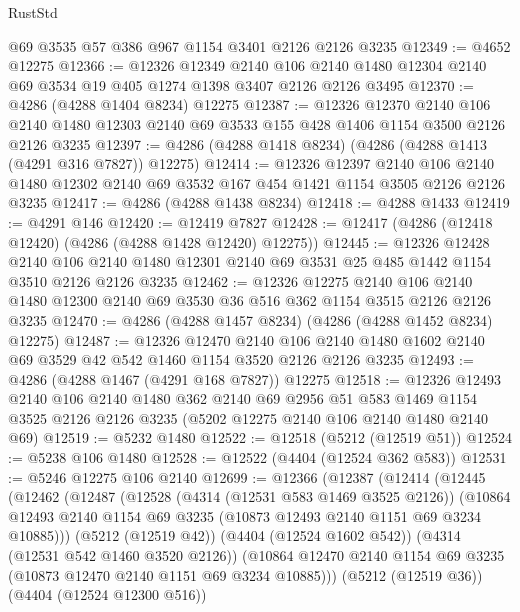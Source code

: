 \begin{lexlean}{RustStd}
\begin{coremodule}
{\begin{coremodule}
{{{{{{{{{{{{{{{{    @69
    @3535
    @57
    @386
    @967
    @1154
    @3401
    @2126
    @2126
    @3235
@12349 := @4652 @12275
@12366 := @12326
    @12349
    @2140
    @106
    @2140
    @1480
    @12304
    @2140
    @69
    @3534
    @19
    @405
    @1274
    @1398
    @3407
    @2126
    @2126
    @3495
@12370 := @4286 (@4288 @1404 @8234) @12275
@12387 := @12326
    @12370
    @2140
    @106
    @2140
    @1480
    @12303
    @2140
    @69
    @3533
    @155
    @428
    @1406
    @1154
    @3500
    @2126
    @2126
    @3235
@12397 := @4286 (@4288 @1418 @8234) (@4286 (@4288 @1413 (@4291 @316 @7827)) @12275)
@12414 := @12326
    @12397
    @2140
    @106
    @2140
    @1480
    @12302
    @2140
    @69
    @3532
    @167
    @454
    @1421
    @1154
    @3505
    @2126
    @2126
    @3235
@12417 := @4286 (@4288 @1438 @8234)
@12418 := @4288 @1433
@12419 := @4291 @146
@12420 := @12419 @7827
@12428 := @12417 (@4286 (@12418 @12420) (@4286 (@4288 @1428 @12420) @12275))
@12445 := @12326
    @12428
    @2140
    @106
    @2140
    @1480
    @12301
    @2140
    @69
    @3531
    @25
    @485
    @1442
    @1154
    @3510
    @2126
    @2126
    @3235
@12462 := @12326
    @12275
    @2140
    @106
    @2140
    @1480
    @12300
    @2140
    @69
    @3530
    @36
    @516
    @362
    @1154
    @3515
    @2126
    @2126
    @3235
@12470 := @4286 (@4288 @1457 @8234) (@4286 (@4288 @1452 @8234) @12275)
@12487 := @12326
    @12470
    @2140
    @106
    @2140
    @1480
    @1602
    @2140
    @69
    @3529
    @42
    @542
    @1460
    @1154
    @3520
    @2126
    @2126
    @3235
@12493 := @4286 (@4288 @1467 (@4291 @168 @7827)) @12275
@12518 := @12326
    @12493
    @2140
    @106
    @2140
    @1480
    @362
    @2140
    @69
    @2956
    @51
    @583
    @1469
    @1154
    @3525
    @2126
    @2126
    @3235
    (@5202 @12275 @2140 @106 @2140 @1480 @2140 @69)
@12519 := @5232 @1480
@12522 := @12518 (@5212 (@12519 @51))
@12524 := @5238 @106 @1480
@12528 := @12522 (@4404 (@12524 @362 @583))
@12531 := @5246 @12275 @106 @2140
@12699 := @12366
    (@12387
      (@12414
        (@12445
          (@12462
            (@12487
              (@12528
                (@4314 (@12531 @583 @1469 @3525 @2126))
                (@10864 @12493 @2140 @1154 @69 @3235 (@10873 @12493 @2140 @1151 @69 @3234 @10885)))
              (@5212 (@12519 @42))
              (@4404 (@12524 @1602 @542))
              (@4314 (@12531 @542 @1460 @3520 @2126))
              (@10864 @12470 @2140 @1154 @69 @3235 (@10873 @12470 @2140 @1151 @69 @3234 @10885)))
            (@5212 (@12519 @36))
            (@4404 (@12524 @12300 @516))
}}}}}}}}}}}}}}}}
\end{coremodule}}
\end{coremodule}
\end{lexlean}

